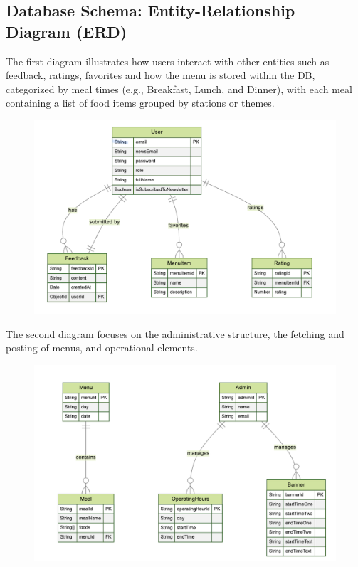 \documentclass[10pt,twocolumn]{article}
\begin{document}
\subsection{Database Schema: Entity-Relationship Diagram (ERD)}\label{erd}
The first diagram illustrates how users interact with other entities such as feedback, ratings, favorites and how the menu is stored within the DB, categorized by meal times (e.g., Breakfast, Lunch, and Dinner), with each meal containing a list of food items grouped by stations or themes.
\begin{figure}[H]
    \centering
    \includegraphics[width=.95\linewidth]{images/Screenshot 2024-12-05 at 4.00.11 PM.png} %
\end{figure}
The second diagram focuses on the administrative structure, the fetching and posting of menus, and operational elements.
\begin{figure}[H]
    \centering
    \includegraphics[width=.95\linewidth]{images/Screenshot 2024-12-05 at 4.00.16 PM.png} %
\end{figure}
\end{document}
